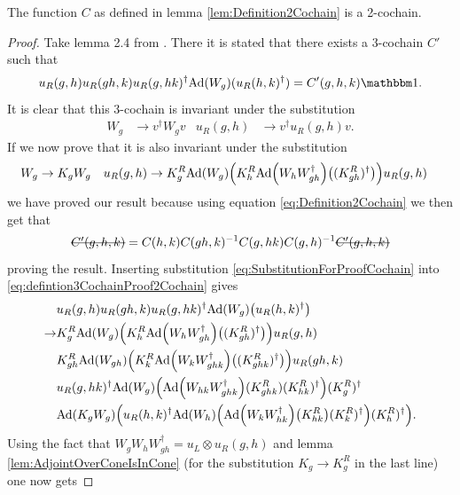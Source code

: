 \documentclass[12pt,a4paper,twoside]{article}
\numberwithin{equation}{section}
\begin{document}
\begin{lemma}
	The function $C$ as defined in lemma \ref{lem:Definition2Cochain} is a 2-cochain.
\end{lemma}
\begin{proof}
	Take lemma 2.4 from \cite{ogata2021h3gmathbb}. There it is stated that there exists a 3-cochain $C'$ such that
	\begin{equation}\label{eq:defintion3CochainProof2Cochain}
		u_R(g,h)u_R(gh,k)u_R(g,hk)^\dagger\Ad{W_g}(u_R(h,k)^\dagger)=C'(g,h,k)\id.
	\end{equation}
	It is clear that this 3-cochain is invariant under the substitution
	\begin{align}
		W_g&\rightarrow v^\dagger W_g v&u_R(g,h)&\rightarrow v^\dagger u_R(g,h)v.
	\end{align}
	If we now prove that it is also invariant under the substitution
	\begin{align}\label{eq:SubstitutionForProofCochain}
		W_g&\rightarrow K_g W_g&u_R(g,h)&\rightarrow K_g^R\Ad{W_g}\left(K_h^R\Ad{W_hW_{gh}^\dagger}\left((K_{gh}^R)^\dagger\right)\right)u_
		R(g,h)
	\end{align}
	we have proved our result because using equation \eqref{eq:Definition2Cochain} we then get that
	\begin{equation}
		\stkout{C'(g,h,k)}=C(h,k)C(gh,k)^{-1}C(g,hk)C(g,h)^{-1}\stkout{C'(g,h,k)}
	\end{equation}
	proving the result. Inserting substitution \eqref{eq:SubstitutionForProofCochain} into \eqref{eq:defintion3CochainProof2Cochain} gives
	\begin{align}
		&u_R(g,h)u_R(gh,k)u_R(g,hk)^\dagger\Ad{W_g}\left(u_R(h,k)^\dagger\right)\\
		\rightarrow&K_g^R\Ad{W_g}\left(K_h^R\Ad{W_hW_{gh}^\dagger}\left((K_{gh}^R)^\dagger\right)\right)u_
		R(g,h)\\
		\nonumber
		&K_{gh}^R\Ad{W_{gh}}\left(K_k^R\Ad{W_kW_{ghk}^\dagger}\left((K_{ghk}^R)^\dagger\right)\right)u_
		R(gh,k)\\
		\nonumber
		&u_R(g,hk)^\dagger \Ad{W_g}\left( \Ad{W_{hk}W_{ghk}^\dagger}(K^R_{ghk})(K^R_{hk})^{\dagger} \right)(K^R_g)^\dagger\\
		\nonumber
		&\Ad{K_gW_g}\left(u_R(h,k)^\dagger \Ad{W_h}\left(\Ad{W_kW_{hk}^\dagger}\left(K_{hk}^R\right)(K^R_k)^\dagger\right)(K^R_h)^\dagger\right).
	\end{align}
	Using the fact that $W_gW_hW_{gh}^\dagger=u_L\otimes u_R(g,h)$ and lemma \ref{lem:AdjointOverConeIsInCone} (for the substitution $K_g\rightarrow K_g^R$ in the last line) one now gets

\end{proof}
\end{document}
